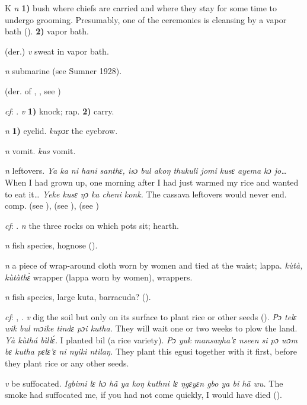 \begin{letter}{K}
 \textit{n} \textbf{1)} bush where chiefs are carried and where they stay for some time to undergo grooming. Presumably, one of the ceremonies is cleansing by a vapor bath (\citealt{Pichl1967}). \textbf{2)} vapor bath.

 (der.) \textit{v} sweat in vapor bath.

 \textit{n} submarine (see Sumner 1928).

 (der. of , , see ) 

 \textit{cf}: . \textit{v} \textbf{1)} knock; rap. \textbf{2)} carry.

 \textit{n} \textbf{1)} eyelid. \textit{kupͻɛ} the eyebrow.

 \textit{n} vomit. \textit{kus} vomit.

 \textit{n} leftovers. \textit{Ya ka ni hani santhɛ, isɔ bul akoŋ thukuli jomi kusɛ ayema kɔ jo…} When I had grown up, one morning after I had just warmed my rice and wanted to eat it… \textit{Yeke kusɛ ŋɔ ka cheni konk.} The cassava leftovers would never end. comp.  (see ),  (see ),  (see ) 

 \textit{cf}: . \textit{n} the three rocks on which pots sit; hearth.

 \textit{n} fish species, hognose (\citealt{Pichl1967}). 

 \textit{n} a piece of wrap-around cloth worn by women and tied at the waist; lappa. \textit{kùtà, kùtàthɛ̀} wrapper (lappa worn by women), wrappers.


 \textit{n} fish species, large kuta, barracuda? (\citealt{Pichl1967}). 

 \textit{cf}: , . \textit{v} dig the soil but only on its surface to plant rice or other seeds (\citealt{Pichl1967}). \textit{Pɔ telɛ wik bul mɔike tindɛ pɔi kutha.} They will wait one or two weeks to plow the land. \textit{Yà kùthá bìllɛ́.} I planted bil (a rice variety). \textit{Pɔ yuk mansaŋha'ɛ nseen si pɔ wɔm bɛ kutha pɛlɛ'ɛ ni nyiki ntilaŋ.} They plant this egusi together with it first, before they plant rice or any other seeds.

 \textit{v} be suffocated. \textit{Igbimi lɛ hɔ hã ya koŋ kuthni lɛ ŋgɛyɛn gbo ya bi hã wu.} The smoke had suffocated me, if you had not come quickly, I would have died (\citealt{Pichl1967}). 


\end{letter}
